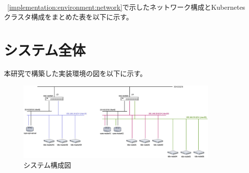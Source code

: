 ~\ref{implementation:environment:network}で示したネットワーク構成とKubernetesクラスタ構成をまとめた表を以下に示す。

\section{システム全体}
本研究で構築した実装環境の図を以下に示す。

\begin{figure}[htbp]
\begin{center}
\includegraphics[width=100mm]{./figures/system-diagram.jpg}
\caption{システム構成図}
\end{center}
\end{figure}

